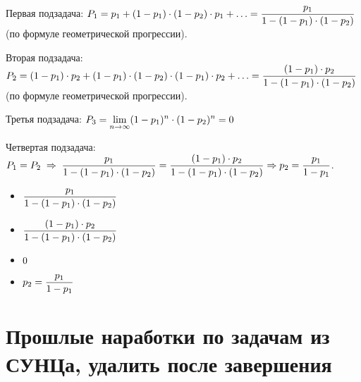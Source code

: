 \documentclass{article}
\begin{document}
\begin{enumerate}
    \solution{}

    Первая подзадача: $\displaystyle{P_1 = p_1 + (1 - p_1) \cdot (1 - p_2) \cdot p_1 + \ldots = \frac{p_1}{1 - (1 - p_1)\cdot(1 - p_2)}}$ (по формуле геометрической прогрессии).

    Вторая подзадача: $\displaystyle{P_2 = (1 - p_1) \cdot p_2 + (1 - p_1) \cdot (1 - p_2) \cdot (1 - p_1) \cdot p_2 + \ldots = \frac{(1 - p_1) \cdot p_2}{1 - (1 - p_1) \cdot (1 - p_2)}}$ (по формуле геометрической прогрессии).

    Третья подзадача: $\displaystyle{P_3 = \lim\limits_{n \rightarrow \infty}(1 - p_1)^n \cdot (1 - p_2) ^ n} = 0$

    Четвертая подзадача: $\displaystyle{P_1 = P_2 \; \Rightarrow \; \frac{p_1}{1 - (1 - p_1)\cdot(1 - p_2)} = \frac{(1 - p_1) \cdot p_2}{1 - (1 - p_1) \cdot (1 - p_2)} \Rightarrow p_2 = \frac{p_1}{1 - p_1}}$.

    \answer{}
    \begin{itemize}
        \item $\displaystyle{ \frac{p_1}{1 - (1 - p_1)\cdot(1 - p_2)}}$
        \item $\displaystyle{ \frac{(1 - p_1) \cdot p_2}{1 - (1 - p_1) \cdot (1 - p_2)}}$
        \item $\displaystyle{0}$
        \item $\displaystyle{ p_2 = \frac{p_1}{1 - p_1}}$
    \end{itemize}
    
\end{enumerate}

\section*{Прошлые наработки по задачам из СУНЦа, удалить после завершения}
























 
	
\end{document}
